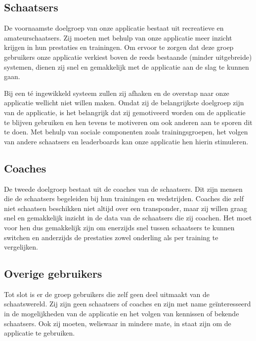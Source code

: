 \newcommand{\doelgroep}{}
\label{sec:doelgroep}

\subsection*{Schaatsers}
De voornaamste doelgroep van onze applicatie bestaat uit recreatieve en amateurschaatsers. Zij moeten met behulp van onze applicatie meer inzicht krijgen in hun prestaties en trainingen. 
Om ervoor te zorgen dat deze groep gebruikers onze applicatie verkiest boven de reeds bestaande (minder uitgebreide) systemen, dienen zij snel en gemakkelijk met de applicatie aan de slag te kunnen gaan.

Bij een té ingewikkeld systeem zullen zij afhaken en de overstap naar onze applicatie wellicht niet willen maken.
Omdat zij de belangrijkste doelgroep zijn van de applicatie, is het belangrijk dat zij gemotiveerd worden om de applicatie te blijven gebruiken en hen tevens te motiveren om ook anderen aan te sporen dit te doen.
Met behulp van sociale componenten zoals trainingsgroepen, het volgen van andere schaatsers en leaderboards kan onze applicatie hen hierin stimuleren.

\subsection*{Coaches}
De tweede doelgroep bestaat uit de coaches van de schaatsers. Dit zijn mensen die de schaatsers begeleiden bij hun trainingen en wedstrijden. Coaches die zelf niet schaatsen beschikken niet altijd over een transponder, maar zij willen graag snel en gemakkelijk inzicht in de data van de schaatsers die zij coachen. Het moet voor hen dus gemakkelijk zijn om enerzijds snel tussen schaatsers te kunnen switchen en anderzijds de prestaties zowel onderling als per training te vergelijken.

\subsection*{Overige gebruikers}
Tot slot is er de groep gebruikers die zelf geen deel uitmaakt van de schaatswereld. Zij zijn geen schaatsers of coaches en zijn met name geïnteresseerd in de mogelijkheden van de applicatie en het volgen van kennissen of bekende schaatsers.
Ook zij moeten, weliswaar in mindere mate, in staat zijn om de applicatie te gebruiken.